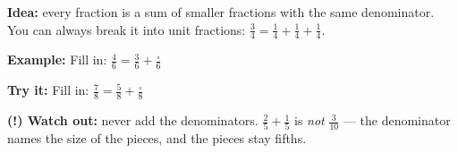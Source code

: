 \documentclass[12pt]{article}
\begin{document}
\begin{formulabox}
\textbf{Idea:} every fraction is a sum of smaller fractions with the same
denominator. You can always break it into unit fractions:
$\tfrac{3}{4} = \tfrac{1}{4} + \tfrac{1}{4} + \tfrac{1}{4}$.
\end{formulabox}

\begin{examplebox}
\textbf{Example:} \quad Fill in: $\tfrac{4}{6} = \tfrac{3}{6} +
\tfrac{\square}{6}$
\end{examplebox}

\begin{tryitbox}
\textbf{Try it:} \quad Fill in: $\tfrac{7}{8} = \tfrac{5}{8} +
\tfrac{\square}{8}$\\[2pt]
\end{tryitbox}

\begin{watchoutbox}
\textbf{(!) Watch out:} never add the denominators.
$\tfrac{2}{5} + \tfrac{1}{5}$ is \emph{not} $\tfrac{3}{10}$ --- the
denominator names the size of the pieces, and the pieces stay fifths.
\end{watchoutbox}
\end{document}

